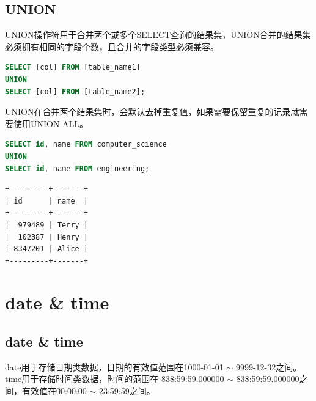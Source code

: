 \documentclass[12pt, openany, oneside]{book}
\begin{document}
\vspace{0.5cm}

\section{UNION}

UNION操作符用于合并两个或多个SELECT查询的结果集，UNION合并的结果集必须拥有相同的字段个数，且合并的字段类型必须兼容。

\vspace{-0.5cm}

\begin{lstlisting}[language=SQL]
SELECT [col] FROM [table_name1]
UNION
SELECT [col] FROM [table_name2];
\end{lstlisting}

UNION在合并两个结果集时，会默认去掉重复值，如果需要保留重复的记录就需要使用UNION ALL。\\


\begin{lstlisting}[language=SQL]
SELECT id, name FROM computer_science
UNION
SELECT id, name FROM engineering;
\end{lstlisting}

\begin{tcolorbox}
\begin{verbatim}
+---------+-------+
| id      | name  |
+---------+-------+
|  979489 | Terry |
|  102387 | Henry |
| 8347201 | Alice |
+---------+-------+
\end{verbatim}
\end{tcolorbox}

\newpage

\chapter{date \& time}

\section{date \& time}

date用于存储日期类数据，日期的有效值范围在1000-01-01 $ \sim $ 9999-12-32之间。\\

time用于存储时间类数据，时间的范围在-838:59:59.000000 $ \sim $ 838:59:59.000000之间，有效值在00:00:00 $ \sim $ 23:59:59之间。\\
\end{document}
